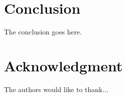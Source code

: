 \documentclass[10pt,conference]{IEEEtran}
\begin{document}
%





\section{Conclusion}
The conclusion goes here.






\section*{Acknowledgment}


The authors would like to thank...





\end{document}
